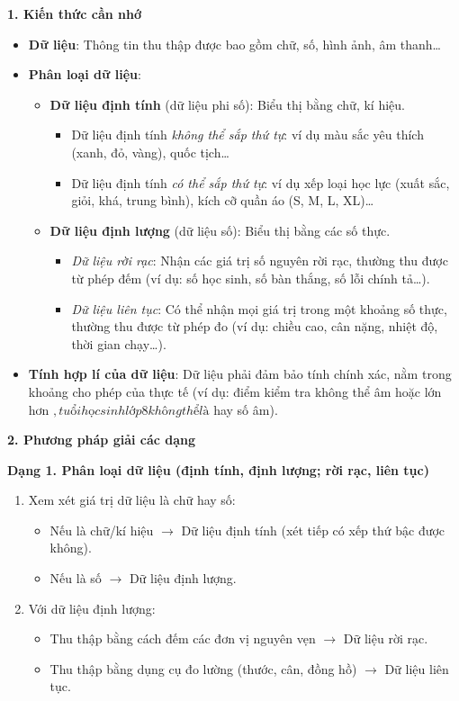 \textbf{1. Kiến thức cần nhớ}
\begin{itemize}
\item \textbf{Dữ liệu}: Thông tin thu thập được bao gồm chữ, số, hình ảnh, âm thanh\dots
\item \textbf{Phân loại dữ liệu}:
\begin{itemize}
\item \textbf{Dữ liệu định tính} (dữ liệu phi số): Biểu thị bằng chữ, kí hiệu.
\begin{itemize}
\item Dữ liệu định tính \textit{không thể sắp thứ tự}: ví dụ màu sắc yêu thích (xanh, đỏ, vàng), quốc tịch\dots
\item Dữ liệu định tính \textit{có thể sắp thứ tự}: ví dụ xếp loại học lực (xuất sắc, giỏi, khá, trung bình), kích cỡ quần áo (S, M, L, XL)\dots
\end{itemize}
\item \textbf{Dữ liệu định lượng} (dữ liệu số): Biểu thị bằng các số thực.
\begin{itemize}
\item \textit{Dữ liệu rời rạc}: Nhận các giá trị số nguyên rời rạc, thường thu được từ phép đếm (ví dụ: số học sinh, số bàn thắng, số lỗi chính tả\dots).
\item \textit{Dữ liệu liên tục}: Có thể nhận mọi giá trị trong một khoảng số thực, thường thu được từ phép đo (ví dụ: chiều cao, cân nặng, nhiệt độ, thời gian chạy\dots).
\end{itemize}
\end{itemize}
\item \textbf{Tính hợp lí của dữ liệu}: Dữ liệu phải đảm bảo tính chính xác, nằm trong khoảng cho phép của thực tế (ví dụ: điểm kiểm tra không thể âm hoặc lớn hơn $, tuổi học sinh lớp 8 không thể là $ hay số âm).
\end{itemize}

\textbf{2. Phương pháp giải các dạng}

\textbf{Dạng 1. Phân loại dữ liệu (định tính, định lượng; rời rạc, liên tục)}
\begin{enumerate}
\item Xem xét giá trị dữ liệu là chữ hay số:
\begin{itemize}
\item Nếu là chữ/kí hiệu $\rightarrow$ Dữ liệu định tính (xét tiếp có xếp thứ bậc được không).
\item Nếu là số $\rightarrow$ Dữ liệu định lượng.
\end{itemize}
\item Với dữ liệu định lượng:
\begin{itemize}
\item Thu thập bằng cách đếm các đơn vị nguyên vẹn $\rightarrow$ Dữ liệu rời rạc.
\item Thu thập bằng dụng cụ đo lường (thước, cân, đồng hồ) $\rightarrow$ Dữ liệu liên tục.
\end{itemize}
\end{enumerate}


